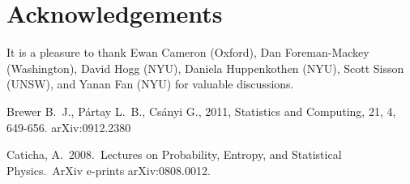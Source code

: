 \documentclass[a4paper, 12pt]{article}
\begin{document}
\section*{Acknowledgements}
It is a pleasure to thank Ewan Cameron (Oxford), Dan
Foreman-Mackey (Washington), David Hogg (NYU), Daniela Huppenkothen (NYU),
Scott Sisson (UNSW), and Yanan Fan (NYU) for valuable discussions.

\begin{thebibliography}{99}
 Brewer B.~J., P{\'a}rtay L.~B., Cs{\'a}nyi G., 2011,
Statistics and Computing, 21, 4, 649-656. arXiv:0912.2380

 Caticha, A.\ 2008.\ Lectures 
on Probability, Entropy, and Statistical Physics.\ ArXiv e-prints 
arXiv:0808.0012.

\end{thebibliography}
\end{document}
